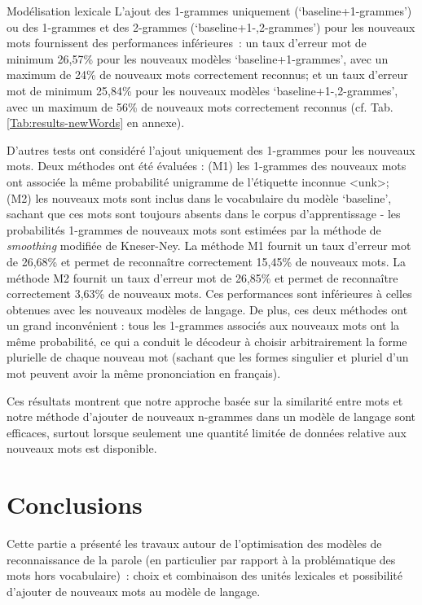 \documentclass{style/these}
\begin{document}
\begin{part}{Modélisation lexicale}
L'ajout des 1-grammes uniquement (`baseline+1-grammes') ou des 1-grammes et des 2-grammes (`baseline+1-,2-grammes') pour les nouveaux mots fournissent des performances inférieures~: un taux d'erreur mot de minimum 26,57\% pour les nouveaux modèles `baseline+1-grammes', avec un maximum de 24\% de nouveaux mots correctement reconnus; et un taux d'erreur mot de minimum 25,84\% pour les nouveaux modèles `baseline+1-,2-grammes', avec un maximum de 56\% de nouveaux mots correctement reconnus (cf. Tab. \ref{Tab:results-newWords} en annexe).

D'autres tests ont considéré l'ajout uniquement des 1-grammes pour les nouveaux mots. 
Deux méthodes ont été évaluées : (M1) les 1-grammes des nouveaux mots ont associée la même probabilité unigramme de l'étiquette inconnue <unk>; (M2) les nouveaux mots sont inclus dans le vocabulaire du modèle `baseline', sachant que ces mots sont toujours absents dans le corpus d'apprentissage - les probabilités 1-grammes de nouveaux mots sont estimées par la méthode de \textit{smoothing} modifiée de Kneser-Ney. 
La méthode M1 fournit un taux d'erreur mot de 26,68\% et permet de reconnaître correctement 15,45\% de nouveaux mots.  
La méthode M2 fournit un taux d'erreur mot de 26,85\% et permet de reconnaître correctement 3,63\% de nouveaux mots. 
Ces performances sont inférieures à celles obtenues avec les nouveaux modèles de langage. 
De plus, ces deux méthodes ont un grand inconvénient : tous les 1-grammes associés aux nouveaux mots ont la même probabilité, ce qui a conduit le décodeur à choisir arbitrairement la forme plurielle de chaque nouveau mot (sachant que les formes singulier et pluriel d'un mot peuvent avoir la même prononciation en français).

Ces résultats montrent que notre approche basée sur la similarité entre mots et notre méthode d'ajouter de nouveaux n-grammes dans un modèle de langage sont efficaces, surtout lorsque seulement une quantité limitée de données relative aux nouveaux mots est disponible.


\chapter{Conclusions}
\renewcommand{\leftmark}{Conclusions}
\renewcommand{\rightmark}{}

Cette partie a présenté les travaux autour de l'optimisation des modèles de reconnaissance de la parole (en particulier par rapport à la problématique des mots hors \linebreak vocabulaire)~: choix et combinaison des unités lexicales et possibilité d'ajouter de nouveaux mots au modèle de langage.


\end{part}
\end{document}
